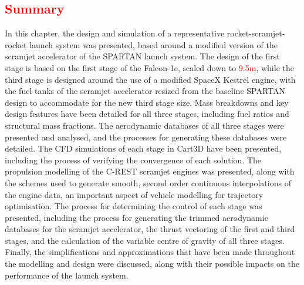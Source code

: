 \textcolor{red}{
	\section{Summary}	
}
	
	
	In this chapter, the design and simulation of a representative rocket-scramjet-rocket launch system was presented, based around a modified version of the scramjet accelerator of the SPARTAN launch system. 
	The design of the first stage is based on the first stage of the Falcon-1e, scaled down to \textcolor{red}{9.5m}, while the third stage is designed around the use of a modified SpaceX Kestrel engine, with the fuel tanks of the scramjet accelerator resized from the baseline SPARTAN design to accommodate for the new third stage size. 
	 Mass breakdowns and key design features have been detailed for all three stages, including fuel ratios and structural mass fractions.
	 The aerodynamic databases of all three stages were presented and analysed, and the processes for generating these databases were detailed. 
	 The CFD simulations of each stage in Cart3D have been presented, including the process of verifying the convergence of each solution. 
	 The propulsion modelling of the C-REST scramjet engines was presented, along with the schemes used to generate smooth, second order continuous interpolations of the engine data, an important aspect of vehicle modelling for trajectory optimisation. 
	The process for determining the control of each stage was presented, including the process for generating the trimmed aerodynamic databases for the scramjet accelerator, the thrust vectoring of the first and third stages, and the calculation of the variable centre of gravity of all three stages. Finally, the simplifications and approximations that have been made throughout the modelling and design were discussed, along with their possible impacts on the performance of the launch system.
	
	